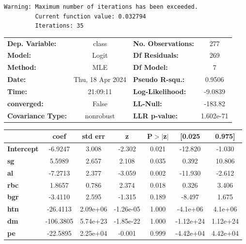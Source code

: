 \documentclass[
  11pt,
  letterpaper,
  DIV=11,
  numbers=noendperiod]{scrartcl}
\begin{document}
\begin{verbatim}
Warning: Maximum number of iterations has been exceeded.
         Current function value: 0.032794
         Iterations: 35
\end{verbatim}

\begin{center}
\begin{tabular}{lclc}
\toprule
\textbf{Dep. Variable:}   &      class       & \textbf{  No. Observations:  } &      277    \\
\textbf{Model:}           &      Logit       & \textbf{  Df Residuals:      } &      269    \\
\textbf{Method:}          &       MLE        & \textbf{  Df Model:          } &        7    \\
\textbf{Date:}            & Thu, 18 Apr 2024 & \textbf{  Pseudo R-squ.:     } &   0.9506    \\
\textbf{Time:}            &     21:09:11     & \textbf{  Log-Likelihood:    } &   -9.0839   \\
\textbf{converged:}       &      False       & \textbf{  LL-Null:           } &   -183.82   \\
\textbf{Covariance Type:} &    nonrobust     & \textbf{  LLR p-value:       } & 1.602e-71   \\
\bottomrule
\end{tabular}
\begin{tabular}{lcccccc}
                   & \textbf{coef} & \textbf{std err} & \textbf{z} & \textbf{P$> |$z$|$} & \textbf{[0.025} & \textbf{0.975]}  \\
\midrule
\textbf{Intercept} &      -6.9247  &        3.008     &    -2.302  &         0.021        &      -12.820    &       -1.030     \\
\textbf{sg}        &       5.5989  &        2.657     &     2.108  &         0.035        &        0.392    &       10.806     \\
\textbf{al}        &      -7.2713  &        2.377     &    -3.059  &         0.002        &      -11.930    &       -2.612     \\
\textbf{rbc}       &       1.8657  &        0.786     &     2.374  &         0.018        &        0.326    &        3.406     \\
\textbf{bgr}       &      -3.4110  &        2.595     &    -1.315  &         0.189        &       -8.497    &        1.675     \\
\textbf{htn}       &     -26.4113  &     2.09e+06     & -1.26e-05  &         1.000        &     -4.1e+06    &      4.1e+06     \\
\textbf{dm}        &    -106.3805  &     5.74e+23     & -1.85e-22  &         1.000        &    -1.12e+24    &     1.12e+24     \\
\textbf{pe}        &     -22.5895  &     2.25e+04     &    -0.001  &         0.999        &    -4.42e+04    &     4.42e+04     \\
\bottomrule
\end{tabular}
\end{center}
\end{document}
